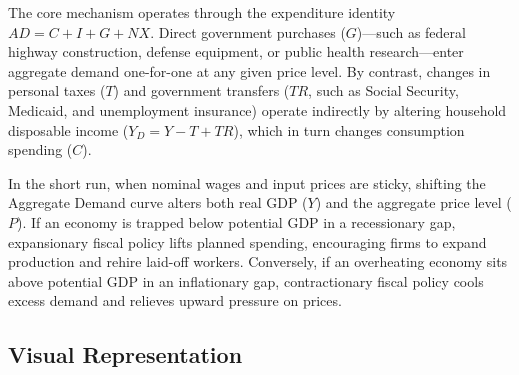 \documentclass[11pt,letterpaper]{article}
\begin{document}
The core mechanism operates through the expenditure identity $AD = C + I + G + NX$. Direct government purchases ($G$)---such as federal highway construction, defense equipment, or public health research---enter aggregate demand one-for-one at any given price level. By contrast, changes in personal taxes ($T$) and government transfers ($TR$, such as Social Security, Medicaid, and unemployment insurance) operate indirectly by altering household disposable income ($Y_D = Y - T + TR$), which in turn changes consumption spending ($C$).

In the short run, when nominal wages and input prices are sticky, shifting the Aggregate Demand curve alters both real GDP ($Y$) and the aggregate price level ($P$). If an economy is trapped below potential GDP in a recessionary gap, expansionary fiscal policy lifts planned spending, encouraging firms to expand production and rehire laid-off workers. Conversely, if an overheating economy sits above potential GDP in an inflationary gap, contractionary fiscal policy cools excess demand and relieves upward pressure on prices.

\subsection*{Visual Representation}
\end{document}
